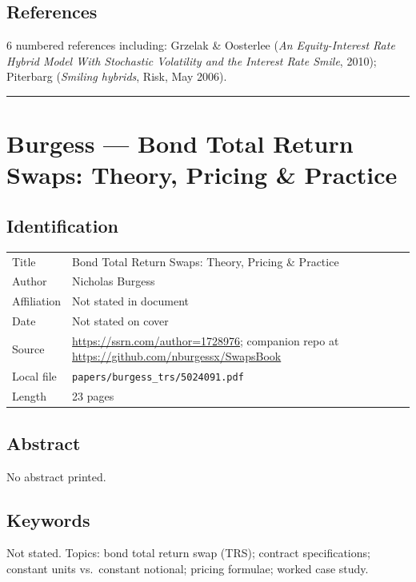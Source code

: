 \documentclass[11pt,a4paper]{article}
\begin{document}
\subsection*{References}
6 numbered references including: Grzelak \& Oosterlee
(\emph{An Equity-Interest Rate Hybrid Model With Stochastic Volatility
and the Interest Rate Smile}, 2010); Piterbarg
(\emph{Smiling hybrids}, Risk, May 2006).

\bigskip\hrule\bigskip

\section{Burgess --- Bond Total Return Swaps: Theory, Pricing \& Practice}
\label{bib:burgess-trs}

\subsection*{Identification}
\begin{tabular}{@{}p{3.5cm}p{11cm}@{}}
\toprule
Title           & Bond Total Return Swaps: Theory, Pricing \& Practice \\
Author          & Nicholas Burgess \\
Affiliation     & Not stated in document \\
Date            & Not stated on cover \\
Source          & \url{https://ssrn.com/author=1728976}; companion repo at \url{https://github.com/nburgessx/SwapsBook} \\
Local file      & \texttt{papers/burgess\_trs/5024091.pdf} \\
Length          & 23 pages \\
\bottomrule
\end{tabular}

\subsection*{Abstract}
No abstract printed.

\subsection*{Keywords}
Not stated. Topics: bond total return swap (TRS); contract specifications; constant units vs.\ constant notional; pricing formulae; worked case study.
\end{document}
